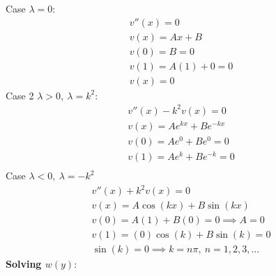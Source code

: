 \documentclass[letterpaper,11pt]{article}
\begin{document}
    Case $\lambda = 0$:
    \begin{gather*}
        v''(x) = 0\\
        v(x) = Ax +B\\
        v(0) = B = 0\\
        v(1) = A(1) + 0 = 0\\
        v(x) = 0
    \end{gather*}
    Case 2 $\lambda > 0, \ \lambda = k^2$:
    \begin{gather*}
        v''(x) - k^2 v(x) = 0\\
        v(x) = Ae^{kx} + Be^{-kx}\\
        v(0) = Ae^{0} + Be^{0} = 0\\
        v(1) = Ae^{k} + Be^{-k} = 0\\
    \end{gather*}
    Case $\lambda < 0, \ \lambda = -k^2$
    \begin{gather*}
        v''(x) + k^2 v(x) = 0\\
        v(x) = A\cos(kx) + B \sin(kx)\\
        v(0) = A(1) + B (0) = 0 \implies A = 0 \\
        v(1) = (0) \cos(k) + B \sin(k) = 0\\
        \sin(k) = 0 \implies k = n\pi, \ n = 1,2,3,\dots
    \end{gather*}
    \textbf{Solving $w(y)$}:
\end{document}
